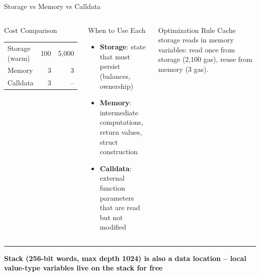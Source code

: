 \documentclass[8pt,aspectratio=169]{beamer}
\newcommand{\bottomnote}[1]{\vfill\vspace{-2mm}\textcolor{mllavender2}{\rule{\textwidth}{0.4pt}}\vspace{1mm}\footnotesize\textbf{#1}}
\begin{document}
\begin{frame}{Storage vs Memory vs Calldata}
\begin{columns}
\begin{block}{Cost Comparison}
\begin{tabular}{@{}lrr@{}}
Storage (warm) & 100 & 5,000 \\
Memory & 3 & 3 \\
Calldata & 3 & -- \\
\bottomrule
\end{tabular}
\end{block}
\vspace{2mm}
\begin{block}{When to Use Each}
\begin{itemize}\small
  \item \textbf{Storage}: state that must persist (balances, ownership)
  \item \textbf{Memory}: intermediate computations, return values, struct construction
  \item \textbf{Calldata}: external function parameters that are read but not modified
\end{itemize}
\end{block}
\vspace{2mm}
\begin{alertblock}{Optimization Rule}
\small Cache storage reads in memory variables: read once from storage (2,100 gas), reuse from memory (3 gas).
\end{alertblock}
\end{columns}
\bottomnote{Stack (256-bit words, max depth 1024) is also a data location -- local value-type variables live on the stack for free}
\end{frame}
\end{document}
